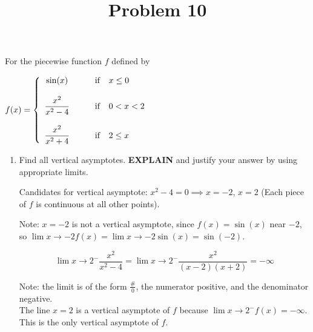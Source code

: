 \documentclass{ximera}
\title[Problem 10]{Problem 10}
\begin{document}
\begin{abstract} \end{abstract}
\maketitle


\begin{problem}
 For the piecewise function $f$ defined by 
 
	$f(x) =   \left\{ \begin{array}{cl}
	\sin(x)		 	&	\qquad \text{if }\hspace{0.1in}  x \leq  0					\\ \\
	\dfrac{x^{2}}{x^{2}-4}	&	\qquad \text{if } \hspace{0.1in}  0< x< 2 	\\ \\
	\dfrac{x^{2}}{x^{2}+4}	&	\qquad \text{if } \hspace{0.1in}  2  \leq x 	
						\end{array} \right.  $
  \begin{enumerate}
    \item Find all vertical asymptotes.   \textbf{EXPLAIN} and justify your answer by using appropriate limits.
        \begin{explanation}
        Candidates for vertical asymptote: $x^{2}-4 = 0 \implies x= -2$,  $x=2$ (Each piece of $f$ is continuous at all other points).

        Note:  $x = -2$ is not a vertical asymptote, since $f(x)=\sin{(x)}$ near $-2$, so $\displaystyle \lim{x\to -2} f(x) = \displaystyle \lim{x\to -2} \sin(x) = \sin(-2)$.

        \[\displaystyle \lim{x \to 2^-} \frac{x^{2}}{x^{2}-4}=\displaystyle \lim{x \to 2^-} \frac{x^{2}}{(x-2)(x+2)}= -\infty \]
        
	Note: the limit is of the form $ \frac{\#}{0}$, the numerator positive, and the denominator negative.  \\

       The line $x=2$ is a vertical asymptote of $f$ because $\displaystyle \lim{x\to 2^-} f(x) = -\infty$. This is the only vertical asymptote of $f$.
     
      \end{explanation}


\end{enumerate}
\end{problem}
\end{document}
